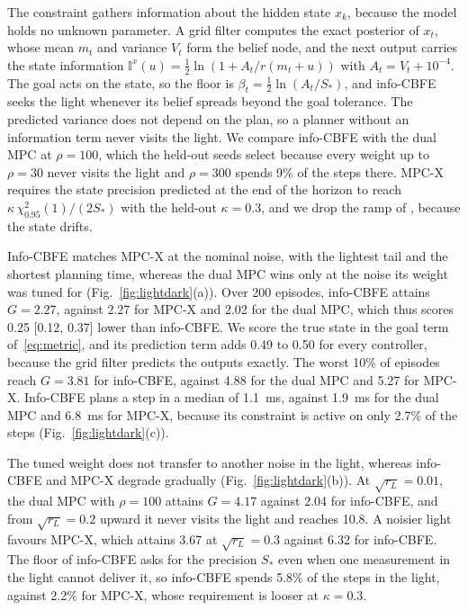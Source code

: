\documentclass{l4dc2027}
\begin{document}
The constraint gathers information about the hidden state $x_k$, because the model holds no unknown parameter. A grid filter computes the exact posterior of $x_t$, whose mean $m_t$ and variance $V_t$ form the belief node, and the next output carries the state information $\mathbb{I}^x(u) = \tfrac{1}{2}\ln(1 + A_t/r(m_t + u))$ with $A_t = V_t + 10^{-4}$. The goal acts on the state, so the floor is $\beta_t = \tfrac{1}{2}\ln(A_t/S_*)$, and info-CBFE seeks the light whenever its belief spreads beyond the goal tolerance. The predicted variance does not depend on the plan, so a planner without an information term never visits the light. We compare info-CBFE with the dual MPC at $\rho = 100$, which the held-out seeds select because every weight up to $\rho = 30$ never visits the light and $\rho = 300$ spends 9\% of the steps there. MPC-X requires the state precision predicted at the end of the horizon to reach $\kappa\,\chi^2_{0.95}(1)/(2S_*)$ with the held-out $\kappa = 0.3$, and we drop the ramp of \citet{larsson2013model}, because the state drifts.

Info-CBFE matches MPC-X at the nominal noise, with the lightest tail and the shortest planning time, whereas the dual MPC wins only at the noise its weight was tuned for (Fig.~\ref{fig:lightdark}(a)). Over 200 episodes, info-CBFE attains $G = 2.27$, against 2.27 for MPC-X and 2.02 for the dual MPC, which thus scores 0.25 [0.12, 0.37] lower than info-CBFE. We score the true state in the goal term of~\eqref{eq:metric}, and its prediction term adds 0.49 to 0.50 for every controller, because the grid filter predicts the outputs exactly. The worst 10\% of episodes reach $G = 3.81$ for info-CBFE, against 4.88 for the dual MPC and 5.27 for MPC-X. Info-CBFE plans a step in a median of 1.1~ms, against 1.9~ms for the dual MPC and 6.8~ms for MPC-X, because its constraint is active on only 2.7\% of the steps (Fig.~\ref{fig:lightdark}(c)).

The tuned weight does not transfer to another noise in the light, whereas info-CBFE and MPC-X degrade gradually (Fig.~\ref{fig:lightdark}(b)). At $\sqrt{r_L} = 0.01$, the dual MPC with $\rho = 100$ attains $G = 4.17$ against 2.04 for info-CBFE, and from $\sqrt{r_L} = 0.2$ upward it never visits the light and reaches 10.8. A noisier light favours MPC-X, which attains 3.67 at $\sqrt{r_L} = 0.3$ against 6.32 for info-CBFE. The floor of info-CBFE asks for the precision $S_*$ even when one measurement in the light cannot deliver it, so info-CBFE spends 5.8\% of the steps in the light, against 2.2\% for MPC-X, whose requirement is looser at $\kappa = 0.3$.
\end{document}
